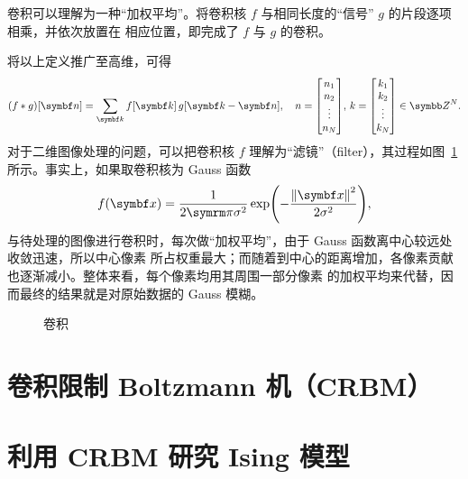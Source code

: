 卷积可以理解为一种“加权平均”。将卷积核 $f$ 与相同长度的“信号” $g$ 的片段逐项相乘，并依次放置在
相应位置，即完成了 $f$ 与 $g$ 的卷积。

将以上定义推广至高维，可得
\begin{equation}
  (f \ast g) [\bm{n}] = \sum_{\bm{k}} f[\bm{k}] \, g[\bm{k}-\bm{n}] \qc
  n=\mqty[n_1 \\ n_2 \\ \vdots \\ n_N], \, k=\mqty[k_1 \\ k_2 \\ \vdots \\ k_N] \in \Z^N.
\end{equation}
对于二维图像处理的问题，可以把卷积核 $f$ 理解为“滤镜”（filter），其过程如图~\ref{fig:convolution}
所示。事实上，如果取卷积核为 Gauss 函数
\begin{equation}
  f(\bm{x}) = \frac{1}{2\pp\sigma^2} \exp(-\frac{\norm{\bm{x}}^2}{2\sigma^2}),
\end{equation}
与待处理的图像进行卷积时，每次做“加权平均”，由于 Gauss 函数离中心较远处收敛迅速，所以中心像素
所占权重最大；而随着到中心的距离增加，各像素贡献也逐渐减小。整体来看，每个像素均用其周围一部分像素
的加权平均来代替，因而最终的结果就是对原始数据的 Gauss 模糊。

\begin{figure}[htb]
  \centering
  \caption{卷积}
  \label{fig:convolution}
\end{figure}

\section{卷积限制 Boltzmann 机（CRBM）}
\section{利用 CRBM 研究 Ising 模型}
